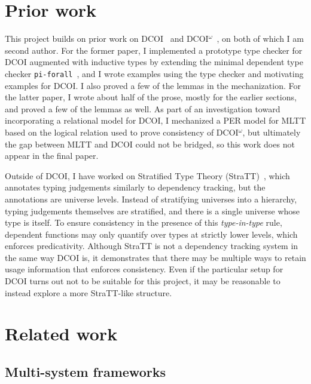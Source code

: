 \documentclass{article}
\begin{document}
\section{Prior work} \label{sec:prior}

This project builds on prior work on DCOI~\citep{dcoi} and DCOI$^\omega$~\citep{dcoi-omega},
on both of which I am second author.
For the former paper,
I implemented a prototype type checker for DCOI augmented with inductive types
by extending the minimal dependent type checker \texttt{pi-forall}~\citep{pi-forall},
and I wrote examples using the type checker and motivating examples for DCOI.
I also proved a few of the lemmas in the mechanization.
For the latter paper,
I wrote about half of the prose, mostly for the earlier sections,
and proved a few of the lemmas as well.
As part of an investigation toward incorporating a relational model for DCOI,
I mechanized a PER model for MLTT based on the logical relation
used to prove consistency of DCOI$^\omega$,
but ultimately the gap between MLTT and DCOI could not be bridged,
so this work does not appear in the final paper.

Outside of DCOI, I have worked on Stratified Type Theory (StraTT)~\citep{stratt},
which annotates typing judgements similarly to dependency tracking,
but the annotations are universe levels.
Instead of stratifying universes into a hierarchy,
typing judgements themselves are stratified,
and there is a single universe whose type is itself.
To ensure consistency in the presence of this \emph{type-in-type} rule,
dependent functions may only quantify over types at strictly lower levels,
which enforces predicativity.
Although StraTT is not a dependency tracking system in the same way DCOI is,
it demonstrates that there may be multiple ways
to retain usage information that enforces consistency.
Even if the particular setup for DCOI turns out not to be suitable for this project,
it may be reasonable to instead explore a more StraTT-like structure.

\section{Related work} \label{sec:related}

\subsection{Multi-system frameworks} \label{sec:multi}
\end{document}
